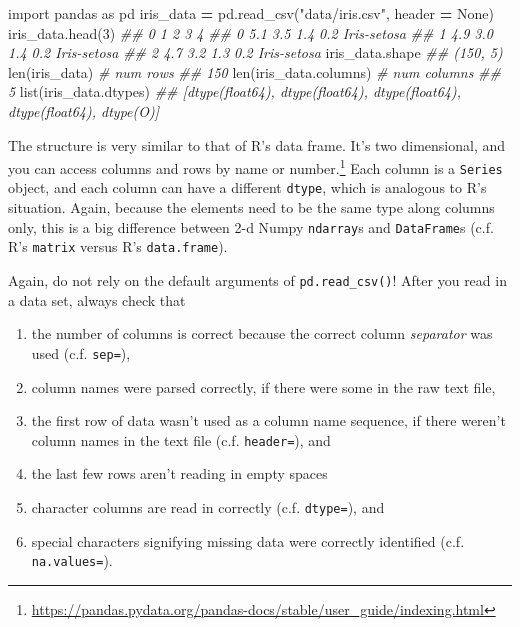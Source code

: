 \documentclass[
  12pt,
  krantz2]{krantz}
\makeatletter
\newenvironment{Shaded}{\begin{snugshade}}{\end{snugshade}}
\newcommand{\BuiltInTok}[1]{#1}
\newcommand{\CommentTok}[1]{\textcolor[rgb]{0.37,0.37,0.37}{\textit{#1}}}
\newcommand{\DecValTok}[1]{\textcolor[rgb]{0.06,0.06,0.06}{#1}}
\newcommand{\ImportTok}[1]{#1}
\newcommand{\NormalTok}[1]{#1}
\newcommand{\OperatorTok}[1]{\textcolor[rgb]{0.43,0.43,0.43}{\textbf{#1}}}
\newcommand{\StringTok}[1]{\textcolor[rgb]{0.5,0.5,0.5}{#1}}
\newcommand{\VariableTok}[1]{\textcolor[rgb]{0,0,0}{#1}}
\providecommand{\tightlist}{%
  \setlength{\itemsep}{0pt}\setlength{\parskip}{0pt}}
\renewcommand{\href}[2]{#2\footnote{\url{#1}}}
\newenvironment{kframe}{%
\medskip{}
\setlength{\fboxsep}{.8em}
 \def\at@end@of@kframe{}%
 \ifinner\ifhmode%
  \def\at@end@of@kframe{\end{minipage}}%
  \begin{minipage}{\columnwidth}%
 \fi\fi%
 \def\FrameCommand##1{\hskip\@totalleftmargin \hskip-\fboxsep
 \colorbox{shadecolor}{##1}\hskip-\fboxsep
     \hskip-\linewidth \hskip-\@totalleftmargin \hskip\columnwidth}%
 \MakeFramed {\advance\hsize-\width
   \@totalleftmargin\z@ \linewidth\hsize
   \@setminipage}}%
 {\par\unskip\endMakeFramed%
 \at@end@of@kframe}
\renewenvironment{Shaded}{\begin{kframe}}{\end{kframe}}
\makeatother
\begin{document}
\begin{Shaded}
\begin{Highlighting}[]
\ImportTok{import}\NormalTok{ pandas }\ImportTok{as}\NormalTok{ pd}
\NormalTok{iris\_data }\OperatorTok{=}\NormalTok{ pd.read\_csv(}\StringTok{"data/iris.csv"}\NormalTok{, header }\OperatorTok{=} \VariableTok{None}\NormalTok{)}
\NormalTok{iris\_data.head(}\DecValTok{3}\NormalTok{)}
\CommentTok{\#\#      0    1    2    3            4}
\CommentTok{\#\# 0  5.1  3.5  1.4  0.2  Iris{-}setosa}
\CommentTok{\#\# 1  4.9  3.0  1.4  0.2  Iris{-}setosa}
\CommentTok{\#\# 2  4.7  3.2  1.3  0.2  Iris{-}setosa}
\NormalTok{iris\_data.shape}
\CommentTok{\#\# (150, 5)}
\BuiltInTok{len}\NormalTok{(iris\_data) }\CommentTok{\# num rows}
\CommentTok{\#\# 150}
\BuiltInTok{len}\NormalTok{(iris\_data.columns) }\CommentTok{\# num columns}
\CommentTok{\#\# 5}
\BuiltInTok{list}\NormalTok{(iris\_data.dtypes)}
\CommentTok{\#\# [dtype(\textquotesingle{}float64\textquotesingle{}), dtype(\textquotesingle{}float64\textquotesingle{}), dtype(\textquotesingle{}float64\textquotesingle{}), dtype(\textquotesingle{}float64\textquotesingle{}), dtype(\textquotesingle{}O\textquotesingle{})]}
\end{Highlighting}
\end{Shaded}

The structure is very similar to that of R's data frame. It's two dimensional, and you can \href{https://pandas.pydata.org/pandas-docs/stable/user_guide/indexing.html}{access columns and rows by name or number.} Each column is a \texttt{Series} object, and each column can have a different \texttt{dtype}, which is analogous to R's situation. Again, because the elements need to be the same type along columns only, this is a big difference between 2-d Numpy \texttt{ndarray}s and \texttt{DataFrame}s (c.f. R's \texttt{matrix} versus R's \texttt{data.frame}).

Again, do not rely on the default arguments of \texttt{pd.read\_csv()}! After you read in a data set, always check that

\begin{enumerate}
\def\labelenumi{\arabic{enumi}.}
\tightlist
\item
  the number of columns is correct because the correct column \emph{separator} was used (c.f. \texttt{sep=}),
\item
  column names were parsed correctly, if there were some in the raw text file,
\item
  the first row of data wasn't used as a column name sequence, if there weren't column names in the text file (c.f. \texttt{header=}), and
\item
  the last few rows aren't reading in empty spaces
\item
  character columns are read in correctly (c.f. \texttt{dtype=}), and
\item
  special characters signifying missing data were correctly identified (c.f. \texttt{na.values=}).
\end{enumerate}
\end{document}
